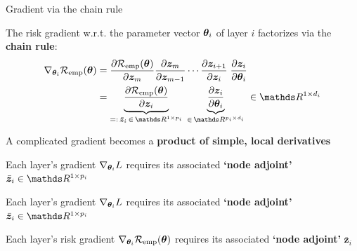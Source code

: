 \documentclass[11pt,compress,t,notes=noshow, xcolor=table]{beamer}
\newcommand{\zv}{\bm{z}}                 %
\newcommand{\adj}[1]{\bar{\bm{z}}_{#1}}  %
\begin{document}
\begin{framei}{Gradient via the chain rule}
\item The risk gradient w.r.t. the parameter vector $\bm{\theta}_i$ of layer $i$ factorizes via the \textbf{chain rule}:
\begin{align*}
\nabla_{\thetav_i} \risket &= \pd{\risket}{\zv_m} \pd{\zv_m}{\zv_{m-1}} \cdots \pd{\zv_{i+1}}{\zv_i} \; \pd{\zv_i}{\thetav_i} \\
&= \underbrace{\pd{\risket}{\zv_i}}_{=: \, \adj{i} \, \in \, \R^{1 \times p_i}} \; \underbrace{\pd{\zv_i}{\thetav_i}}_{\in \, \R^{p_i \times d_i}} \; \in \R^{1 \times d_i}
\end{align*}
\item[$\Rightarrow$] A complicated gradient becomes a \textbf{product of simple, local derivatives}
\item[$\Rightarrow$] Each layer's gradient $\nabla_{\bm{\theta}_i} L$ requires its associated \textbf{`node adjoint'} $\adj{i} \in \R^{1 \times p_i}$
\item[$\Rightarrow$] Each layer's gradient $\nabla_{\bm{\theta}_i} L$ requires its associated \textbf{`node adjoint'} $\adj{i} \in \R^{1 \times p_i}$
\item[$\Rightarrow$] Each layer's risk gradient $\nabla_{\bm{\theta}_i} \mathcal{R}_{\text{emp}}(\bm{\theta})$ requires its associated \textbf{`node adjoint'} $\adj{i}$
\end{framei}
\end{document}
